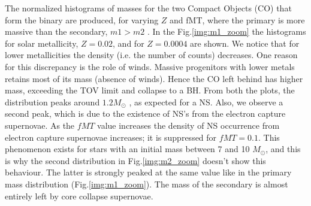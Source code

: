 \documentclass[preprint,12pt]{elsarticle}
\begin{document}
The normalized histograms of masses for the two Compact Objects (CO) that form the binary are produced, for varying $Z$ and fMT, where the primary is more massive than the secondary, $m1 > m2$ . In the Fig.\ref{img:m1_zoom} the histograms for solar metallicity, $Z=0.02$, and for $Z=0.0004$ are shown. We notice that for lower metallicities the density (i.e. the number of counts) decreases. One reason for this discrepancy is the role of winds. Massive progenitors with lower metals retains most of its mass (absence of winds). Hence the CO left behind has higher mass, exceeding the TOV limit\citep{Tolman:1939, Volkoff:1939} and collapse to a BH. From both the plots, the distribution peaks around $1.2 M_{\odot}$ , as expected for a NS. Also, we observe a second peak, which is due to the existence of NS's from the electron capture supernovae. As the $fMT$ value increases the density of NS occurrence from electron capture supernovae increases; it is suppressed for $fMT=0.1$. This phenomenon exists for stars with an initial mass between 7 and 10 $M_{\odot}$, and this is why the second distribution in Fig.\ref{img:m2_zoom} doesn't show this behaviour. The latter is strongly peaked at the same value like in the primary mass distribution (Fig.\ref{img:m1_zoom}). The mass of the secondary is almost entirely left by core collapse supernovae.
\end{document}
